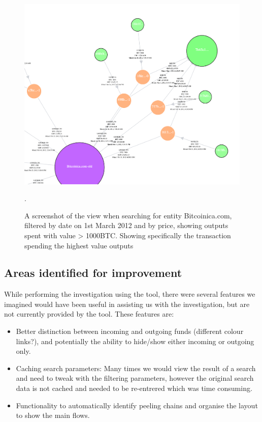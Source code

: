\begin{figure}[h!]
  \centering
  \includegraphics[width = 15cm]{./figures/theft-high-value-tx}\\[0.5cm]
  \caption{A screenshot of the view when searching for entity Bitcoinica.com, filtered by date on 1st March 2012 and by price, showing outputs spent with value > 1000BTC. Showing specifically the transaction spending the highest value outputs}.
  \label{fig:theft-highest-value-outputs}
\end{figure}

\subsection{Areas identified for improvement}
While performing the investigation using the tool, there were several features we imagined would have been useful in assisting us with the investigation, but are not currently provided by the tool. These features are:
\begin{itemize}
    \item Better distinction between incoming and outgoing funds (different colour links?), and potentially the ability to hide/show either incoming or outgoing only.
    \item Caching search parameters: Many times we would view the result of a search and need to tweak with the filtering parameters, however the original search data is not cached and needed to be re-entrered which was time consuming.
    \item Functionality to automatically identify peeling chains and organise the layout to show the main flows. 
    
\end{itemize}

